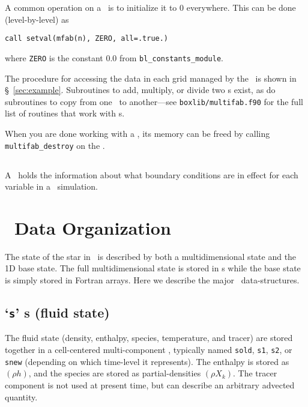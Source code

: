 A common operation on a \multifab\ is to initialize it to $0$
everywhere.  This can be done (level-by-level) as
\begin{lstlisting}[language={[95]fortran},mathescape=false]
call setval(mfab(n), ZERO, all=.true.)
\end{lstlisting}
where {\tt ZERO} is the constant 0.0 from {\tt bl\_constants\_module}.

The procedure for accessing the data in each grid managed by the \multifab\
is shown in \S~\ref{sec:example}.  
Subroutines to add, multiply, or divide two \multifab s exist, as do
subroutines to copy from one \multifab\ to another---see {\tt boxlib/multifab.f90}
for the full list of routines that work with \multifab s.


When you are done working with a \multifab, its memory can be freed by
calling {\tt multifab\_destroy} on the \multifab.




\subsection{\bctower}

A \bctower\ holds the information about what boundary conditions are
in effect for each variable in a \maestro\ simulation.  

\section{\maestro\ Data Organization}

The state of the star in \maestro\ is described by both a
multidimensional state and the 1D base state.  The full
multidimensional state is stored in \multifab s while the base state
is simply stored in Fortran arrays.  Here we describe the
major \maestro\ data-structures.




\subsection{`{\tt s}' \multifab s (fluid state)}

The fluid state (density, enthalpy, species, temperature, and tracer)
are stored together in a cell-centered multi-component \multifab,
typically named {\tt sold}, {\tt s1}, {\tt s2}, or {\tt snew}
(depending on which time-level it represents).  The enthalpy is stored
as $(\rho h)$, and the species are stored as partial-densities $(\rho
X_k)$.  The tracer component is not used at present time, but can
describe an arbitrary advected quantity.

